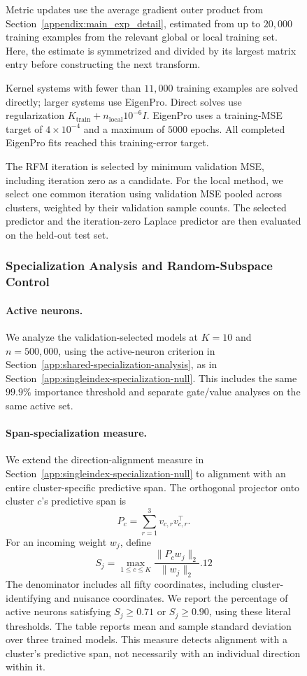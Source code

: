 \documentclass{article}
\newcounter{model}[section]
\begin{document}
\begin{figure}
Metric updates use the average gradient outer product from
Section~\ref{appendix:main_exp_detail}, estimated from up to \(20{,}000\)
training examples from the relevant global or local training set.
Here, the estimate is symmetrized and divided
by its largest matrix entry before constructing the next transform.

Kernel systems with fewer than \(11{,}000\) training examples are solved
directly; larger systems use EigenPro. Direct solves use regularization
\(K_{\mathrm{train}}+n_{\mathrm{local}}10^{-6}I\).
EigenPro uses a training-MSE target of \(4\times10^{-4}\) and a maximum
of \(5000\) epochs.
All completed EigenPro fits reached this training-error target.

The RFM iteration is selected by minimum validation MSE, including
iteration zero as a candidate. For the local method, we select one common
iteration using validation MSE pooled across clusters, weighted by their
validation sample counts. The selected predictor and the iteration-zero
Laplace predictor are then evaluated on the held-out test set.

\subsubsection{Specialization Analysis and Random-Subspace Control}
\label{app:multiindex-specialization-null}

\paragraph{Active neurons.}
We analyze the validation-selected models at \(K=10\) and
\(n=500{,}000\), using the active-neuron criterion in
Section~\ref{app:shared-specialization-analysis}, as in
Section~\ref{app:singleindex-specialization-null}. This includes the same
\(99.9\%\) importance threshold and separate gate/value analyses on the
same active set.

\paragraph{Span-specialization measure.}
We extend the direction-alignment measure in
Section~\ref{app:singleindex-specialization-null} to alignment with an
entire cluster-specific predictive span. The orthogonal projector onto
cluster \(c\)'s predictive span is
\[
    P_c=\sum_{r=1}^{3}v_{c,r}v_{c,r}^{\top}.
\]
For an incoming weight \(w_j\), define
\begin{equation}
    S_j=\max_{1\leq c\leq K}
    \frac{\|P_cw_j\|_2}{\|w_j\|_2}.
    \label{eq:multiindex-span-specialization}
12\end{equation}
The denominator includes all fifty coordinates, including
cluster-identifying and nuisance coordinates.
We report the percentage of active neurons satisfying
\(S_j\geq0.71\) or \(S_j\geq0.90\), using these literal thresholds.
The table reports mean and sample standard deviation over three
trained models. This measure detects alignment with a cluster's
predictive span, not necessarily with an individual direction within it.


\end{figure}
\end{document}
